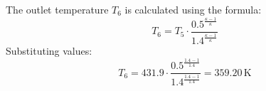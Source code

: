 The outlet temperature \( T_6 \) is calculated using the formula:  
\[
T_6 = T_5 \cdot \frac{0.5^{\frac{\kappa - 1}{\kappa}}}{1.4^{\frac{\kappa - 1}{\kappa}}}
\]  
Substituting values:  
\[
T_6 = 431.9 \cdot \frac{0.5^{\frac{1.4 - 1}{1.4}}}{1.4^{\frac{1.4 - 1}{1.4}}} = 359.20 \, \text{K}
\]